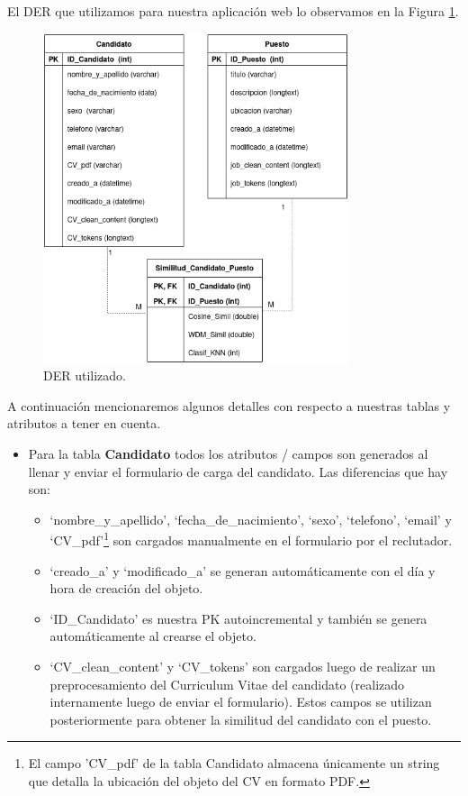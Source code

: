 \documentclass[12pt,a4paper]{article}
\begin{document}
\begin{sloppypar}
El DER que utilizamos para nuestra aplicación web lo observamos en la Figura \ref{fig:Entity_Relation}.\\

\begin{figure}[H]    %
 \centering
 \includegraphics[width=0.8\textwidth]{images/BD_Entity_Relation.png}
 \caption{DER utilizado.} 
 \label{fig:Entity_Relation}
\end{figure}

\cleardoublepage

A continuación mencionaremos algunos detalles con respecto a nuestras tablas y atributos a tener en cuenta.

\begin{itemize}
\item Para la tabla \textbf{Candidato} todos los atributos / campos son generados al llenar y enviar el formulario de carga del candidato. Las diferencias que hay son:

\begin{itemize}
\item ‘nombre\_y\_apellido’, ‘fecha\_de\_nacimiento’, ‘sexo’, ‘telefono’, ‘email’ y ‘CV\_pdf’\footnote{El campo 'CV\_pdf' de la tabla Candidato almacena únicamente un string que detalla la ubicación del objeto del CV en formato PDF.} son cargados manualmente en el formulario por el reclutador.
\item ‘creado\_a’ y ‘modificado\_a’ se generan automáticamente con el día y hora de creación del objeto.
\item ‘ID\_Candidato’ es nuestra PK autoincremental y también se genera automáticamente al crearse el objeto. 
\item ‘CV\_clean\_content’ y ‘CV\_tokens’ son cargados luego de realizar un preprocesamiento del Curriculum Vitae del candidato (realizado internamente luego de enviar el formulario). Estos campos se utilizan posteriormente para obtener la similitud del candidato con el puesto. 
\end{itemize}


\end{itemize}
\end{sloppypar}
\end{document}
